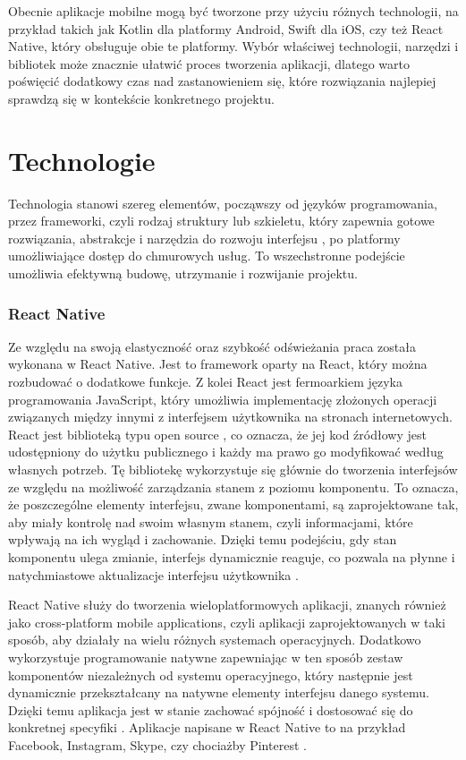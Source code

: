 \phantom{th}
Obecnie aplikacje mobilne mogą być tworzone przy użyciu różnych technologii, na
przykład takich jak Kotlin dla platformy Android, Swift dla iOS, czy też React Native, który
obsługuje obie te platformy. Wybór właściwej technologii, narzędzi i bibliotek może znacznie
ułatwić proces tworzenia aplikacji, dlatego warto poświęcić dodatkowy czas nad
zastanowieniem się, które rozwiązania najlepiej sprawdzą się w kontekście konkretnego
projektu.

\section{Technologie}
\phantom{Th}
Technologia stanowi szereg elementów, począwszy od języków programowania, przez
frameworki, czyli rodzaj struktury lub szkieletu, który zapewnia gotowe rozwiązania, abstrakcje i narzędzia do rozwoju interfejsu \cite{framework}, po platformy umożliwiające dostęp do chmurowych usług. To wszechstronne podejście umożliwia efektywną budowę, utrzymanie i rozwijanie projektu.

\subsubsection*{\textbf{React Native}}
\phantom{th}
Ze względu na swoją elastyczność oraz szybkość odświeżania praca została wykonana
w React Native. Jest to framework oparty na React, który można rozbudować o dodatkowe
funkcje. Z kolei React jest fermoarkiem języka programowania JavaScript, który umożliwia
implementację złożonych operacji związanych między innymi z interfejsem użytkownika na
stronach internetowych. React jest biblioteką typu open source \cite{opensource}, co oznacza, że jej kod
źródłowy jest udostępniony do użytku publicznego i każdy ma prawo go modyfikować według
własnych potrzeb. Tę bibliotekę wykorzystuje się głównie do tworzenia interfejsów ze względu na możliwość zarządzania stanem z poziomu komponentu. To oznacza, że poszczególne
elementy interfejsu, zwane komponentami, są zaprojektowane tak, aby miały kontrolę nad
swoim własnym stanem, czyli informacjami, które wpływają na ich wygląd i zachowanie. Dzięki temu podejściu, gdy stan komponentu ulega zmianie, interfejs dynamicznie reaguje, co pozwala na płynne i natychmiastowe aktualizacje interfejsu użytkownika \cite{javascripteverywhere}.

React Native służy do tworzenia wieloplatformowych aplikacji, znanych również jako cross-platform mobile applications, czyli aplikacji zaprojektowanych w taki sposób, aby działały na wielu różnych systemach operacyjnych. Dodatkowo wykorzystuje programowanie natywne zapewniając w ten sposób zestaw komponentów niezależnych od systemu operacyjnego, który następnie jest dynamicznie przekształcany na natywne elementy interfejsu danego systemu. Dzięki temu aplikacja jest w stanie zachować spójność i dostosować się do konkretnej specyfiki \cite{reactnative}. Aplikacje napisane w React Native to na przykład Facebook, Instagram, Skype, czy chociażby Pinterest \cite{javascripteverywhere}.

